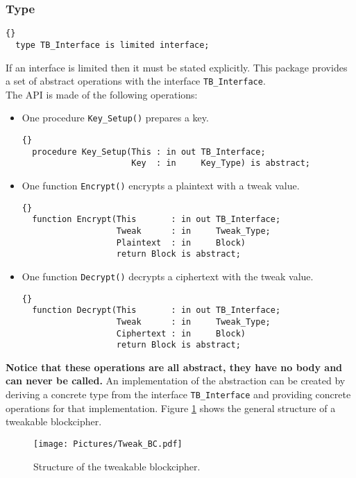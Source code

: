 \subsubsection*{Type}
\begin{lstlisting}{}
  type TB_Interface is limited interface;
\end{lstlisting}
If an interface is limited then it must be stated explicitly. This package provides a set of abstract operations with the interface \texttt{TB\_Interface}.\\
The API is made of the following operations:
\begin{itemize}
\item One procedure \texttt{Key\_Setup()} prepares a key.
\begin{lstlisting}{}
  procedure Key_Setup(This : in out TB_Interface;
                      Key  : in     Key_Type) is abstract;
\end{lstlisting}
\item One function \texttt{Encrypt()} encrypts a plaintext with a tweak value.
\begin{lstlisting}{}
  function Encrypt(This       : in out TB_Interface;
                   Tweak      : in     Tweak_Type;
                   Plaintext  : in     Block) 
                   return Block is abstract;
\end{lstlisting}
\item One function \texttt{Decrypt()} decrypts a ciphertext with the tweak value.
\begin{lstlisting}{}
  function Decrypt(This       : in out TB_Interface;
                   Tweak      : in     Tweak_Type;
                   Ciphertext : in     Block) 
                   return Block is abstract;
\end{lstlisting}
\end{itemize}
\textbf{Notice that these operations are all abstract, they have no body and can never be called.} An implementation of the abstraction can be created by deriving a concrete type from the interface \texttt{TB\_Interface} and providing concrete operations for that implementation. Figure \ref{TweakBlock} shows the general structure of a tweakable blockcipher.
\begin{figure}[htp]
\centering
\texttt{[image: Pictures/Tweak\_BC.pdf]} 
\caption{Structure of the tweakable blockcipher.}\label{TweakBlock}
\end{figure}
